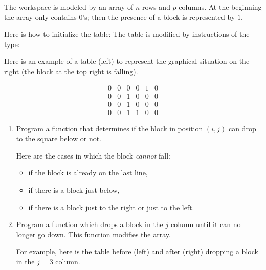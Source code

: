 \documentclass[11pt,class=report,crop=false]{standalone}
\begin{document}
\begin{activite}


The workspace is modeled by an array of $n$ rows and $p$ columns. At the beginning the array only contains $0$'s;
 then the presence of a block is represented by $1$.

Here is how to initialize the table:
The table is modified by instructions of the type:


Here is an example of a table (left) to represent the graphical situation on the right (the block at the top right is falling).

\begin{center}
\begin{minipage}{0.3\textwidth}
$$\begin{array}{cccccc}
0&0&0&0&1&0\\
0&0&1&0&0&0\\
0&0&1&0&0&0\\
0&0&1&1&0&0
\end{array}$$
\end{minipage}
\begin{minipage}{0.4\textwidth}
\end{minipage}
\end{center}

\begin{enumerate}
  \item Program a function  that determines if the block in position $(i,j)$ can drop to the square below or not.
  
  Here are the cases in which the block \emph{cannot} fall:
  \begin{itemize}
    \item if the block is already on the last line,
    \item if there is a block just below,
    \item if there is a block just to the right or just to the left.
  \end{itemize}
  
  \item Program a function 
which drops a block in the $j$ column until it can no longer go down.
This function modifies the array.  
  
  For example, here is the table before (left) and after (right) dropping a block in the $j=3$ column.  
  

\end{enumerate}
\end{activite}
\end{document}
